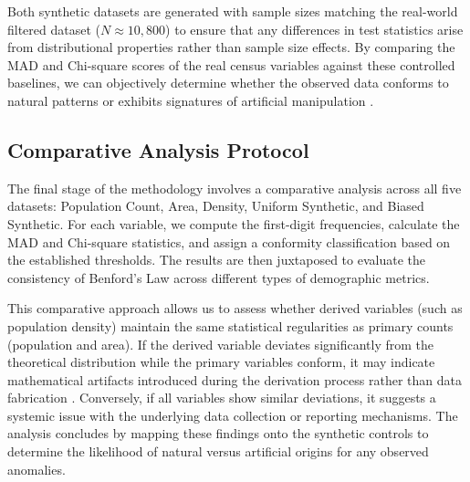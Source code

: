 \documentclass[11pt,a4paper]{article}
\begin{document}
Both synthetic datasets are generated with sample sizes matching the real-world filtered dataset ($N \approx 10,800$) to ensure that any differences in test statistics arise from distributional properties rather than sample size effects. By comparing the MAD and Chi-square scores of the real census variables against these controlled baselines, we can objectively determine whether the observed data conforms to natural patterns or exhibits signatures of artificial manipulation \cite{Petras2025DetectingBL}.

\subsection{Comparative Analysis Protocol}
The final stage of the methodology involves a comparative analysis across all five datasets: Population Count, Area, Density, Uniform Synthetic, and Biased Synthetic. For each variable, we compute the first-digit frequencies, calculate the MAD and Chi-square statistics, and assign a conformity classification based on the established thresholds. The results are then juxtaposed to evaluate the consistency of Benford's Law across different types of demographic metrics.

This comparative approach allows us to assess whether derived variables (such as population density) maintain the same statistical regularities as primary counts (population and area). If the derived variable deviates significantly from the theoretical distribution while the primary variables conform, it may indicate mathematical artifacts introduced during the derivation process rather than data fabrication \cite{Morales2022BenfordsLF}. Conversely, if all variables show similar deviations, it suggests a systemic issue with the underlying data collection or reporting mechanisms. The analysis concludes by mapping these findings onto the synthetic controls to determine the likelihood of natural versus artificial origins for any observed anomalies.
\end{document}
